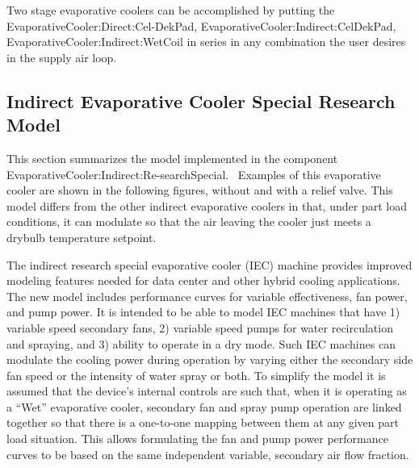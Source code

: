 Two stage evaporative coolers can be accomplished by putting the EvaporativeCooler:Direct:Cel-DekPad, EvaporativeCooler:Indirect:CelDekPad, EvaporativeCooler:Indirect:WetCoil in series in any combination the user desires in the supply air loop.

\subsection{Indirect Evaporative Cooler Special Research Model}\label{indirect-evaporative-cooler-special-research-model}

This section summarizes the model implemented in the component EvaporativeCooler:Indirect:Re-searchSpecial.~ Examples of this evaporative cooler are shown in the following figures, without and with a relief valve. This model differs from the other indirect evaporative coolers in that, under part load conditions, it can modulate so that the air leaving the cooler just meets a drybulb temperature setpoint.

The indirect research special evaporative cooler (IEC) machine provides improved modeling features needed for data center and other hybrid cooling applications. The new model includes performance curves for variable effectiveness, fan power, and pump power. It is intended to be able to model IEC machines that have 1) variable speed secondary fans, 2) variable speed pumps for water recirculation and spraying, and 3) ability to operate in a dry mode. Such IEC machines can modulate the cooling power during operation by varying either the secondary side fan speed or the intensity of water spray or both. To simplify the model it is assumed that the device's internal controls are such that, when it is operating as a ``Wet'' evaporative cooler, secondary fan and spray pump operation are linked together so that there is a one-to-one mapping between them at any given part load situation. This allows formulating the fan and pump power performance curves to be based on the same independent variable, secondary air flow fraction.

